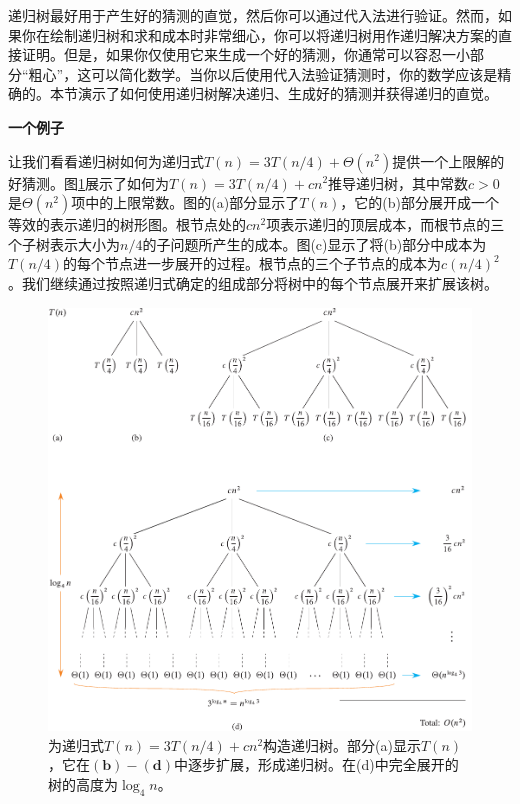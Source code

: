 \documentclass[lang=cn,newtx,10pt,scheme=chinese]{elegantbook}
\begin{document}
递归树最好用于产生好的猜测的直觉，然后你可以通过代入法进行验证。然而，如果你在绘制递归树和求和成本时非常细心，你可以将递归树用作递归解决方案的直接证明。但是，如果你仅使用它来生成一个好的猜测，你通常可以容忍一小部分“粗心”，这可以简化数学。当你以后使用代入法验证猜测时，你的数学应该是精确的。本节演示了如何使用递归树解决递归、生成好的猜测并获得递归的直觉。

\textbf{一个例子}

让我们看看递归树如何为递归式$T(n)=3 T(n / 4)+\Theta\left(n^2\right)$提供一个上限解的好猜测。图\ref{fig:4-1}展示了如何为$T(n)=3 T(n / 4)+c n^2$推导递归树，其中常数$c>0$是$\Theta\left(n^2\right)$项中的上限常数。图的(a)部分显示了$T(n)$，它的(b)部分展开成一个等效的表示递归的树形图。根节点处的$c n^2$项表示递归的顶层成本，而根节点的三个子树表示大小为$n / 4$的子问题所产生的成本。图(c)显示了将(b)部分中成本为$T(n / 4)$的每个节点进一步展开的过程。根节点的三个子节点的成本为$c(n / 4)^2$。我们继续通过按照递归式确定的组成部分将树中的每个节点展开来扩展该树。

\begin{figure}[htbp]
    \centering
    \includegraphics{算法导论第四版插图/第四章/4-1.pdf}
    \caption{为递归式$T(n)=3 T(n/4)+cn^2$构造递归树。部分(a)显示$T(n)$，它在$(\mathbf{b})-(\mathbf{d})$中逐步扩展，形成递归树。在(d)中完全展开的树的高度为$\log_4 n$。}
    \label{fig:4-1}
\end{figure}
\end{document}
